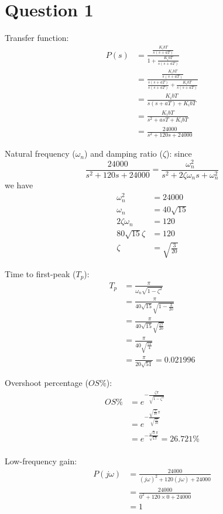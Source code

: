 \documentclass[12pt]{article}
\begin{document}


\section{Question 1}
Transfer function:
\begin{align*}
P(s) &= \frac{\frac{K_i bT}{s(s + aT)}}{1 + \frac{K_i bT}{s(s + aT)}} \\
&= \frac{\frac{K_i bT}{s(s + aT)}}{\frac{s(s + aT)}{s(s + aT)} + \frac{K_i bT}{s(s + aT)}} \\
&= \frac{K_i bT}{s(s + aT) + K_i bT} \\
&= \frac{K_i bT}{s^2 + asT + K_i bT} \\
&= \frac{24000}{s^2 + 120s + 24000}
\end{align*}

Natural frequency ($\omega_n$) and damping ratio ($\zeta$): since \[ \frac{24000}{s^2 + 120s + 24000} = \frac{\omega_n^2}{s^2 + 2\zeta\omega_n s + \omega_n^2} \] we have
\begin{align*}
\omega_n^2 &= 24000 \\
\omega_n &= 40\sqrt{15} \\
2\zeta\omega_n &= 120 \\
80\sqrt{15}\zeta &= 120 \\
\zeta &= \sqrt{\frac{3}{20}}
\end{align*}

Time to first-peak ($T_p$):
\begin{align*}
T_p &= \frac{\pi}{\omega_n\sqrt{1 - \zeta^2}} \\
&= \frac{\pi}{40\sqrt{15}\sqrt{1 - \frac{3}{20}}} \\
&= \frac{\pi}{40\sqrt{15}\sqrt{\frac{17}{20}}} \\
&= \frac{\pi}{40\sqrt{\frac{51}{4}}} \\
&= \frac{\pi}{20\sqrt{51}} = 0.021996
\end{align*}

Overshoot percentage ($OS\%$):
\begin{align*}
OS\% &= e^{-\frac{\zeta\pi}{\sqrt{1 - \zeta^2}}} \\
&= e^{-\frac{\sqrt{\frac{3}{20}}\pi}{\sqrt{\frac{17}{20}}}} \\
&= e^{-\frac{\sqrt{3}\pi}{\sqrt{17}}} = 26.721\% \\
\end{align*}

Low-frequency gain:
\begin{align*}
P(j\omega) &= \frac{24000}{(j\omega)^2 + 120(j\omega) + 24000} \\
&= \frac{24000}{0^2 + 120\times 0 + 24000} \\
&= 1
\end{align*}
\end{document}
